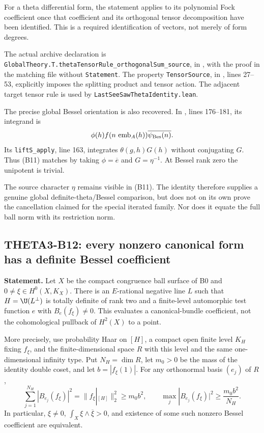 \documentclass[11pt]{article}
\theoremstyle{definition}\newtheorem{definition}[theorem]{Definition}\newtheorem{remark}[theorem]{Remark}
\begin{document}
For a theta differential form, the statement applies to its polynomial Fock coefficient once that coefficient and its orthogonal tensor decomposition have been identified. This is a required identification of vectors, not merely of form degrees.

The actual archive declaration is
\nolinkurl{GlobalTheory.T.thetaTensorRule_orthogonalSum_source}, in
, with the proof in the matching file without \texttt{Statement}. The property \texttt{TensorSource}, in , lines 27--53, explicitly imposes the splitting product and tensor action. The adjacent target tensor rule is used by \nolinkurl{LastSeeSawThetaIdentity.lean}.

The precise global Bessel orientation is also recovered. In
, lines 176--181, its integrand is
\[
 \phi(h)f(n\,\operatorname{emb}_A(h))\overline{\psi_{\rm Bes}(n)}.
\]
Its \texttt{liftS\_apply}, line 163, integrates $\theta(g,h)G(h)$ without conjugating $G$. Thus (B11) matches by taking $\phi=\overline e$ and $G=\eta^{-1}$. At Bessel rank zero the unipotent is trivial.

The source character $\eta$ remains visible in (B11). The identity therefore supplies a genuine global definite-theta/Bessel comparison, but does not on its own prove the cancellation claimed for the special iterated family. Nor does it equate the full ball norm with its restriction norm.

\subsection{THETA3-B12: every nonzero canonical form has a definite Bessel coefficient}\label{B12}

\textbf{Statement.} Let $X$ be the compact congruence ball surface of B0 and $0\ne\xi\in H^0(X,K_X)$. There is an $E$-rational negative line $L$ such that $H=\U(L^\perp)$ is totally definite of rank two and a finite-level automorphic test function $e$ with $B_e(f_\xi)\ne0$. This evaluates a canonical-bundle coefficient, not the cohomological pullback of $H^2(X)$ to a point.

More precisely, use probability Haar on $[H]$, a compact open finite level $K_H$ fixing $f_\xi$, and the finite-dimensional space $R$ with this level and the same one-dimensional infinity type. Put $N_H=\dim R$, let $m_0>0$ be the mass of the identity double coset, and let $b=|f_\xi(1)|$. For any orthonormal basis $(e_j)$ of $R$,
\[
 \sum_{j=1}^{N_H}|B_{e_j}(f_\xi)|^2
      =\|f_\xi|_{[H]}\|_2^2\geq m_0b^2,
 \qquad
 \max_j|B_{e_j}(f_\xi)|^2\geq\frac{m_0b^2}{N_H}.
 \tag{B12}
\]
In particular, $\xi\ne0$, $\int_X\xi\wedge\overline\xi>0$, and existence of some such nonzero Bessel coefficient are equivalent.
\end{document}
